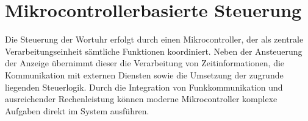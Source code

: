 \section{Mikrocontrollerbasierte Steuerung}
Die Steuerung der Wortuhr erfolgt durch einen Mikrocontroller, der als zentrale Verarbeitungseinheit sämtliche Funktionen koordiniert. 
Neben der Ansteuerung der Anzeige übernimmt dieser die Verarbeitung von Zeitinformationen, die Kommunikation mit externen Diensten sowie die Umsetzung der zugrunde liegenden Steuerlogik. 
Durch die Integration von Funkkommunikation und ausreichender Rechenleistung können moderne Mikrocontroller komplexe Aufgaben direkt im System ausführen. 
